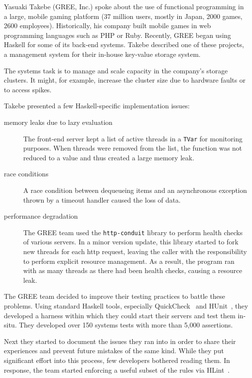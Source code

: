 \documentclass{jfp1}
\begin{document}
Yasuaki Takebe (GREE, Inc.) spoke about the use of functional programming
in a large, mobile gaming platform (37 million users, mostly in Japan,
2000 games, 2600 employees).  Historically, his company built mobile games
in web programming languages such as PHP or Ruby. Recently, GREE began
using Haskell for some of its back-end systems. Takebe described one of
these projects, a management system for their in-house key-value storage
system.

The systems task is to manage and scale capacity in the company's storage
clusters. It might, for example, increase the cluster size due to hardware
faults or to access spikes.

Takebe presented a few Haskell-specific implementation issues:

\begin{description}

\item[memory leaks due to lazy evaluation] The front-end server kept a
list of active threads in a \texttt{TVar} for monitoring purposes.  
When threads were removed from the list, the function was not reduced to a
value and thus created a large memory leak.

\item[race conditions] A race condition between dequeueing items and an
asynchronous exception thrown by a timeout handler caused the loss of data.

\item[performance degradation] The GREE team used the \texttt{http-conduit}
library to perform health checks of various servers. In a minor version
update, this library started to fork new threads for each http request,
leaving the caller with the responsibility to perform explicit resource
management. As a result, the program ran with as many threads as there had
been health checks, causing a resource leak. 
\end{description}

The GREE team decided to improve their testing practices to battle these
problems. Using standard Haskell tools, especially
QuickCheck~\cite{Claessen:2011:Quickcheck} and
HUnit~\cite{Herington:2014:HUnit}, they developed a harness within which
they could start their servers and test them in-situ. They developed over
150 systems tests with more than 5,000 assertions.

Next they started to document the issues they ran into in order to share
their experiences and prevent future mistakes of the same kind.  While they
put significant effort into this process, few developers bothered reading
them. In response, the team started enforcing a useful subset of the rules
via HLint~\cite{Mitchell:2014:HLint}.
\end{document}
